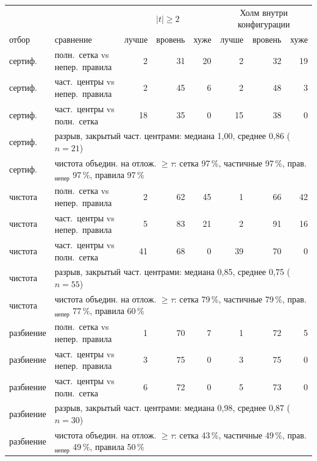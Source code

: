 \begin{tabular}{llrrrrrr}
\toprule
& & \multicolumn{3}{c}{$|t|\ge2$} & \multicolumn{3}{c}{Холм внутри конфигурации}\\
отбор & сравнение & лучше & вровень & хуже & лучше & вровень & хуже\\
\midrule
сертиф. & полн.~сетка vs непер.~правила & 2 & 31 & 20 & 2 & 32 & 19\\
сертиф. & част.~центры vs непер.~правила & 2 & 45 & 6 & 2 & 48 & 3\\
сертиф. & част.~центры vs полн.~сетка & 18 & 35 & 0 & 15 & 38 & 0\\
сертиф. & \multicolumn{7}{l}{разрыв, закрытый част. центрами: медиана 1{,}00, среднее 0{,}86 ($n=21$)}\\
сертиф. & \multicolumn{7}{l}{чистота объедин. на отлож. $\ge\tau$: сетка 97\,\%, частичные 97\,\%, прав.$_{\mathrm{непер}}$ 97\,\%, правила 97\,\%}\\
\midrule
чистота & полн.~сетка vs непер.~правила & 2 & 62 & 45 & 1 & 66 & 42\\
чистота & част.~центры vs непер.~правила & 5 & 83 & 21 & 2 & 91 & 16\\
чистота & част.~центры vs полн.~сетка & 41 & 68 & 0 & 39 & 70 & 0\\
чистота & \multicolumn{7}{l}{разрыв, закрытый част. центрами: медиана 0{,}85, среднее 0{,}75 ($n=55$)}\\
чистота & \multicolumn{7}{l}{чистота объедин. на отлож. $\ge\tau$: сетка 79\,\%, частичные 79\,\%, прав.$_{\mathrm{непер}}$ 77\,\%, правила 60\,\%}\\
\midrule
разбиение & полн.~сетка vs непер.~правила & 1 & 70 & 7 & 1 & 72 & 5\\
разбиение & част.~центры vs непер.~правила & 3 & 75 & 0 & 3 & 75 & 0\\
разбиение & част.~центры vs полн.~сетка & 6 & 72 & 0 & 5 & 73 & 0\\
разбиение & \multicolumn{7}{l}{разрыв, закрытый част. центрами: медиана 0{,}98, среднее 0{,}87 ($n=30$)}\\
разбиение & \multicolumn{7}{l}{чистота объедин. на отлож. $\ge\tau$: сетка 43\,\%, частичные 49\,\%, прав.$_{\mathrm{непер}}$ 49\,\%, правила 50\,\%}\\
\bottomrule
\end{tabular}
